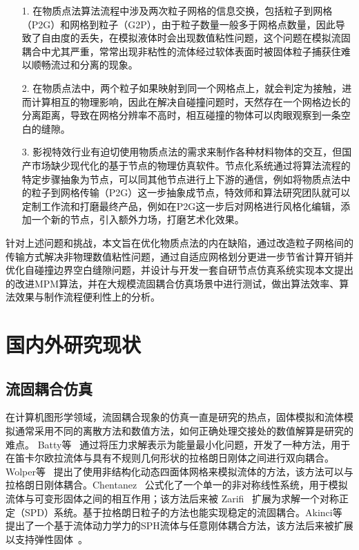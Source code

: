 \begin{enumerate}
    \item[1.] 在物质点法算法流程中涉及两次粒子网格的信息交换，包括粒子到网格（P2G）和网格到粒子（G2P），由于粒子数量一般多于网格点数量，因此导致了自由度的丢失，在模拟液体时会出现数值粘性问题，这个问题在模拟流固耦合中尤其严重，常常出现非粘性的流体经过软体表面时被固体粒子捕获住难以顺畅流过和分离的现象。
    \item[2.] 在物质点法中，两个粒子如果映射到同一个网格点上，就会判定为接触，进而计算相互的物理影响，因此在解决自碰撞问题时，天然存在一个网格边长的分离距离，导致在网格分辨率不高时，相互碰撞的物体可以肉眼观察到一条空白的缝隙。
    \item[3.] 影视特效行业有迫切使用物质点法的需求来制作各种材料物体的交互，但国产市场缺少现代化的基于节点的物理仿真软件。节点化系统通过将算法流程的特定步骤抽象为节点，可以同其他节点进行上下游的通信，例如将物质点法中的粒子到网格传输（P2G）这一步抽象成节点，特效师和算法研究团队就可以定制工作流和打磨最终产品，例如在P2G这一步后对网格进行风格化编辑，添加一个新的节点，引入额外力场，打磨艺术化效果。
\end{enumerate}


针对上述问题和挑战，本文旨在优化物质点法的内在缺陷，通过改造粒子网格间的传输方式解决非物理数值粘性问题，通过自适应网格划分更进一步节省计算开销并优化自碰撞边界空白缝隙问题，并设计与开发一套自研节点仿真系统实现本文提出的改进MPM算法，并在大规模流固耦合仿真场景中进行测试，做出算法效率、算法效果与制作流程便利性上的分析。

\section{国内外研究现状}
\subsection{流固耦合仿真}
在计算机图形学领域，流固耦合现象的仿真一直是研究的热点，固体模拟和流体模拟通常采用不同的离散方法和数值方法，如何正确处理交接处的数值解算是研究的难点。
Batty等~\cite{batty2007fast} 通过将压力求解表示为能量最小化问题，开发了一种方法，用于在笛卡尔欧拉流体与具有不规则几何形状的拉格朗日刚体之间进行双向耦合。Wolper等~\cite{klingner2006fluid} 提出了使用非结构化动态四面体网格来模拟流体的方法，该方法可以与拉格朗日刚体耦合。Chentanez~\cite{chentanez2006simultaneous} 公式化了一个单一的非对称线性系统，用于模拟流体与可变形固体之间的相互作用；该方法后来被 Zarifi~\cite{zarifi2017positive} 扩展为求解一个对称正定（SPD）系统。基于拉格朗日粒子的方法也能实现稳定的流固耦合。Akinci等~\cite{akinci2012versatile} 提出了一个基于流体动力学力的SPH流体与任意刚体耦合方法，该方法后来被扩展以支持弹性固体~\cite{akinci2013coupling}。

